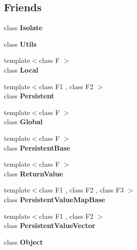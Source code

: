 \subsection*{Friends}
\begin{DoxyCompactItemize}
\item 
\mbox{\label{classv8_1_1PersistentBase_aba4f0964bdacf2bbf62cf876e5d28d0a}} 
class {\bfseries Isolate}
\item 
\mbox{\label{classv8_1_1PersistentBase_abc0f7da619e9e72510dc07ed7b5ff6d8}} 
class {\bfseries Utils}
\item 
\mbox{\label{classv8_1_1PersistentBase_afb872edb4aac7ba55f0da004113aa2b0}} 
{\footnotesize template$<$class F $>$ }\\class {\bfseries Local}
\item 
\mbox{\label{classv8_1_1PersistentBase_ad845ec8872174be0a9ca9a3dd1898d30}} 
{\footnotesize template$<$class F1 , class F2 $>$ }\\class {\bfseries Persistent}
\item 
\mbox{\label{classv8_1_1PersistentBase_adc49d0fc7441cf7e3b5f039334e44243}} 
{\footnotesize template$<$class F $>$ }\\class {\bfseries Global}
\item 
\mbox{\label{classv8_1_1PersistentBase_abb172e0bb22fc5fed7a3a66f29d046ce}} 
{\footnotesize template$<$class F $>$ }\\class {\bfseries Persistent\+Base}
\item 
\mbox{\label{classv8_1_1PersistentBase_a53f604d3d6f2dc0647df33c9979f116a}} 
{\footnotesize template$<$class F $>$ }\\class {\bfseries Return\+Value}
\item 
\mbox{\label{classv8_1_1PersistentBase_a08e2b8f164392d71811ce6cc134f33e3}} 
{\footnotesize template$<$class F1 , class F2 , class F3 $>$ }\\class {\bfseries Persistent\+Value\+Map\+Base}
\item 
\mbox{\label{classv8_1_1PersistentBase_a978bb1377559897d74d5fe883a54a315}} 
{\footnotesize template$<$class F1 , class F2 $>$ }\\class {\bfseries Persistent\+Value\+Vector}
\item 
\mbox{\label{classv8_1_1PersistentBase_a0720b5f434e636e22a3ed34f847eec57}} 
class {\bfseries Object}
\end{DoxyCompactItemize}


